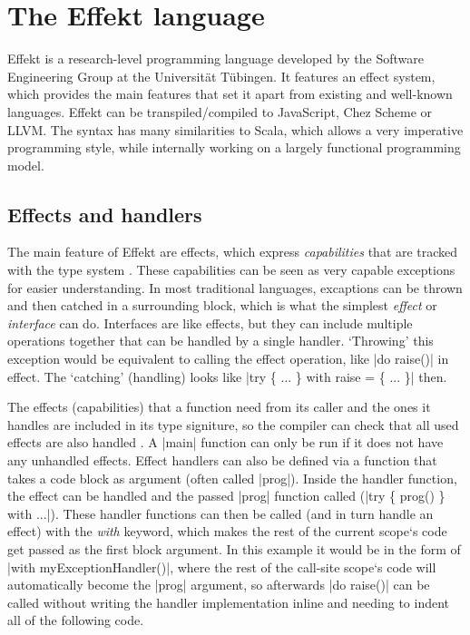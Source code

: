 \chapter{The Effekt language}\label{chap:effekt}

Effekt is a research-level programming language developed by the Software Engineering Group at the Universität Tübingen. It features an effect system, which provides the main features that set it apart from existing and well-known languages. Effekt can be transpiled/compiled to JavaScript, Chez Scheme or LLVM. The syntax has many similarities to Scala, which allows a very imperative programming style, while internally working on a largely functional programming model.

\section{Effects and handlers}

The main feature of Effekt are effects, which express \textit{capabilities} that are tracked with the type system \cite{brachthauser2020effects}. These capabilities can be seen as very capable exceptions for easier understanding. In most traditional languages, excaptions can be thrown and then catched in a surrounding block, which is what the simplest \textit{effect} or \textit{interface} can do. Interfaces are like effects, but they can include multiple operations together that can be handled by a single handler. `Throwing' this exception would be equivalent to calling the effect operation, like |do raise()| in effect. The `catching' (handling) looks like |try \{ ... \} with raise = \{ ... \}| then.

The effects (capabilities) that a function need from its caller and the ones it handles are included in its type signiture, so the compiler can check that all used effects are also handled \cite{brachthauser2022effects}. A |main| function can only be run if it does not have any unhandled effects. Effect handlers can also be defined via a function that takes a code block as argument (often called |prog|). Inside the handler function, the effect can be handled and the passed |prog| function called (|try \{ prog() \} with ...|). These handler functions can then be called (and in turn handle an effect) with the \textit{with} keyword, which makes the rest of the current scope`s code get passed as the first block argument. In this example it would be in the form of |with myExceptionHandler()|, where the rest of the call-site scope`s code will automatically become the |prog| argument, so afterwards |do raise()| can be called without writing the handler implementation inline and needing to indent all of the following code.

